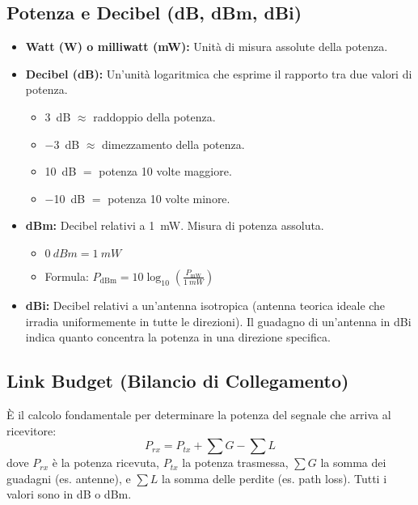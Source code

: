 \subsection*{Potenza e Decibel (dB, dBm, dBi)}
\begin{itemize}
    \item \textbf{Watt (W) o milliwatt (mW):} Unità di misura assolute della potenza.
    \item \textbf{Decibel (dB):} Un'unità logaritmica che esprime il rapporto tra due valori di potenza.
        \begin{itemize}
            \item \SI{+3}{dB} $\approx$ raddoppio della potenza.
            \item \SI{-3}{dB} $\approx$ dimezzamento della potenza.
            \item \SI{+10}{dB} $=$ potenza 10 volte maggiore.
            \item \SI{-10}{dB} $=$ potenza 10 volte minore.
        \end{itemize}
    \item \textbf{dBm:} Decibel relativi a \SI{1}{mW}. Misura di potenza assoluta.
        \begin{itemize}
            \item $\SI{0}{dBm} = \SI{1}{mW}$
            \item Formula: $P_{\text{dBm}} = 10 \log_{10}\left(\frac{P_{\text{mW}}}{\SI{1}{mW}}\right)$
        \end{itemize}
    \item \textbf{dBi:} Decibel relativi a un'antenna isotropica (antenna teorica ideale che irradia uniformemente in tutte le direzioni). Il guadagno di un'antenna in dBi indica quanto concentra la potenza in una direzione specifica.
\end{itemize}

\subsection*{Link Budget (Bilancio di Collegamento)}
È il calcolo fondamentale per determinare la potenza del segnale che arriva al ricevitore:
\begin{equation}
    P_{rx} = P_{tx} + \sum G - \sum L
\end{equation}
dove $P_{rx}$ è la potenza ricevuta, $P_{tx}$ la potenza trasmessa, $\sum G$ la somma dei guadagni (es. antenne), e $\sum L$ la somma delle perdite (es. path loss). Tutti i valori sono in dB o dBm.

